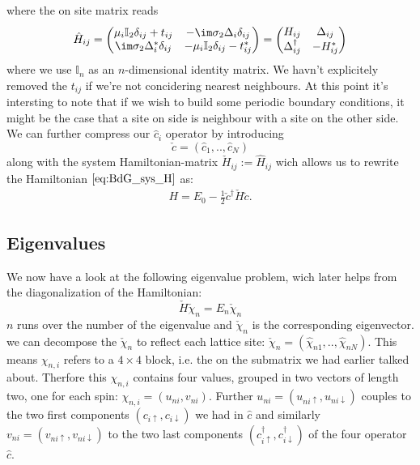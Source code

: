 \documentclass[../main.tex]{subfile}
\begin{document}
where the on site matrix reads
\begin{align}
    \hat{H}_{ij} = \begin{pmatrix}
        \mu_i \mathbb{I}_2 \delta_{ij} + t_{ij} & -\im\sigma_2\Delta_i \delta_{ij}\\
        \im\sigma_2\Delta^{\ast}_i \delta_{ij} & -\mu_i \mathbb{I}_2 \delta_{ij} - t_{ij}^{\ast}
    \end{pmatrix} = \begin{pmatrix}
        H_{ij} & \Delta_{ij}\\
        \Delta_{ij}^{\dagger} & -H_{ij}^{\ast}
    \end{pmatrix}    \label{eq:H^_ij} 
\end{align}
where we use $\mathbb{I}_n$ as an $n$-dimensional identity matrix. We havn't explicitely removed the 
$t_{ij}$ if we're not concidering nearest neighbours.
At this point it's intersting to note that if we wish to build some periodic boundary conditions, 
it might be the case that a site on side is neighbour with a site on the other side.\\  

We can further compress our $\hat{c}_i$ operator by introducing 
\[
    \check{c} = (\hat{c}_1,..,\hat{c}_N)
\] 
along with the system Hamiltonian-matrix $\check{H}_{ij} := \hat{H}_{ij}$ wich allows us to rewrite the Hamiltonian $\ref{eq:BdG_sys_H}$ as:
\begin{align}
    H = E_0 - \frac{1}{2} \check{c}^\dagger \check{H} \check{c}.
\end{align}
\subsection{Eigenvalues}
We now have a look at the following eigenvalue problem, wich later helps from the diagonalization of the Hamiltonian:
\[
    \check{H} \check{\chi}_n = E_n \check{\chi}_n
\]
$n$ runs over the number of the eigenvalue and $\check{\chi}_n$ is the corresponding eigenvector.
we can decompose the $\check{\chi}_n$ to reflect each lattice site: $\check{\chi}_n = (\hat{\chi}_{n1},..,\hat{\chi}_{nN})$. 
This means $\chi_{n,i}$ refers to a $4\times4$ block, i.e. the on the submatrix we had earlier talked about.
Therfore this $\chi_{n,i}$ contains four values, grouped in two vectors of length two, one for each spin: $\chi_{n,i} = (u_{ni}, v_{ni})$.
Further $u_{ni} = (u_{ni\uparrow}, u_{ni\downarrow})$ couples to the two first components $(c_{i\uparrow},c_{i\downarrow})$ we had in $\hat{c}$ and 
similarly $v_{ni} = (v_{ni\uparrow}, v_{ni\downarrow})$ to the two last components $(c_{i\uparrow}^{\dagger},c_{i\downarrow}^{\dagger})$ of
the four operator $\hat{c}$.\\ 
\end{document}
